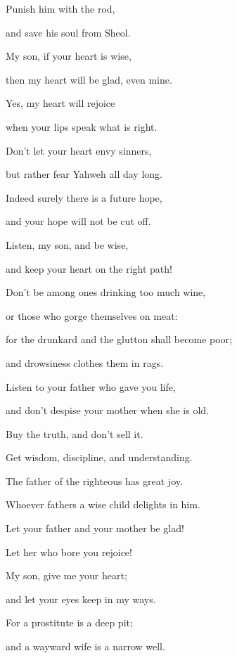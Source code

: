 {\par }{\Q {}Punish him with the rod,
\par }{\QB and save his soul from Sheol.
\par }{\BB \par }{\Q {}My son, if your heart is wise,
\par }{\QB then my heart will be glad, even mine.
\par }{\Q {}Yes, my heart will rejoice
\par }{\QB when your lips speak what is right.
\par }{\Q {}Don’t let your heart envy sinners,
\par }{\QB but rather fear Yahweh all day long.
\par }{\Q {}Indeed surely there is a future hope,
\par }{\QB and your hope will not be cut off.
\par }{\Q {}Listen, my son, and be wise,
\par }{\QB and keep your heart on the right path!
\par }{\Q {}Don’t be among ones drinking too much wine,
\par }{\QB or those who gorge themselves on meat:
\par }{\Q {}for the drunkard and the glutton shall become poor;
\par }{\QB and drowsiness clothes them in rags.
\par }{\Q {}Listen to your father who gave you life,
\par }{\QB and don’t despise your mother when she is old.
\par }{\Q {}Buy the truth, and don’t sell it.
\par }{\QB Get wisdom, discipline, and understanding.
\par }{\Q {}The father of the righteous has great joy.
\par }{\QB Whoever fathers a wise child delights in him.
\par }{\Q {}Let your father and your mother be glad!
\par }{\QB Let her who bore you rejoice!
\par }{\Q {}My son, give me your heart;
\par }{\QB and let your eyes keep in my ways.
\par }{\Q {}For a prostitute is a deep pit;
\par }{\QB and a wayward wife is a narrow well.
}
